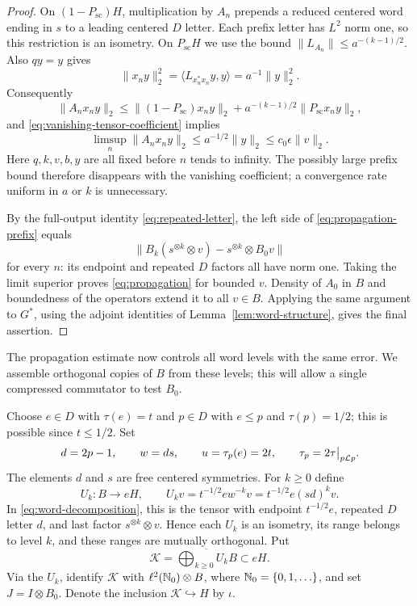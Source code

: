 \begin{proof}
On $(1-P_{\mathrm{sc}})H$, multiplication by $A_n$ prepends a reduced centered word
ending in $s$ to a leading centered $D$ letter. Each prefix letter has
$L^2$ norm one, so this restriction is an isometry. On $P_{\mathrm{sc}}H$ we use
the bound $\|L_{A_n}\|\le a^{-(k-1)/2}$. Also $qy=y$ gives
\[
  \|x_ny\|_2^2
     =\langle L_{x_n^*x_n}y,y\rangle=a^{-1}\|y\|_2^2.
\]
Consequently
\[
  \|A_nx_ny\|_2
   \le \|(1-P_{\mathrm{sc}})x_ny\|_2
        +a^{-(k-1)/2}\|P_{\mathrm{sc}}x_ny\|_2,
\]
and \eqref{eq:vanishing-tensor-coefficient} implies
\[
  \limsup_n\|A_nx_ny\|_2
       \le a^{-1/2}\|y\|_2\le c_0\epsilon\|v\|_2.
\]
Here $q,k,v,b,y$ are all fixed before $n$ tends to infinity. The
possibly large prefix bound therefore disappears with the vanishing
coefficient; a convergence rate uniform in $a$ or $k$ is unnecessary.

By the full-output identity \eqref{eq:repeated-letter}, the left side
of \eqref{eq:propagation-prefix} equals
\[
  \big\|B_k(s^{\otimes k}\otimes v)
            -s^{\otimes k}\otimes B_0v\big\|
\]
for every $n$: its endpoint and repeated $D$ factors all have norm one.
Taking the limit superior proves \eqref{eq:propagation} for bounded $v$.
Density of $A_0$ in $B$ and boundedness of the operators extend it to
all $v\in B$. Applying the same argument to $G^*$, using the adjoint
identities of Lemma~\ref{lem:word-structure}, gives the final assertion.
\end{proof}

The propagation estimate now controls all word levels with the same
error. We assemble orthogonal copies of $B$ from these levels; this
will allow a single compressed commutator to test $B_0$.

Choose $e\in D$ with $\tau(e)=t$ and $p\in D$ with $e\le p$ and
$\tau(p)=1/2$; this is possible since $t\le1/2$. Set
\begin{equation}
  d=2p-1,\qquad w=ds,\qquad u=\tau_p(e)=2t,\qquad
  \tau_p=2\tau\big|_{p\mathcal L p}.
  \label{eq:dihedral-parameters}
\end{equation}
The elements $d$ and $s$ are free centered symmetries. For $k\ge0$ define
\[
  U_k:B\longrightarrow eH,\qquad
  U_kv=t^{-1/2}ew^{-k}v=t^{-1/2}e(sd)^kv.
\]
In \eqref{eq:word-decomposition}, this is the tensor with endpoint
$t^{-1/2}e$, repeated $D$ letter $d$, and last factor
$s^{\otimes k}\otimes v$. Hence each $U_k$ is an isometry, its range
belongs to level $k$, and these ranges are mutually orthogonal. Put
\[
  \mathcal K=\overline{\bigoplus_{k\ge0}U_kB}\subset eH.
\]
Via the $U_k$, identify $\mathcal K$ with
$\ell^2(\mathbb N_0)\otimes B$, where $\mathbb N_0=\{0,1,\ldots\}$, and set
$J=I\otimes B_0$. Denote the inclusion $\mathcal K\hookrightarrow H$
by $\iota$.

